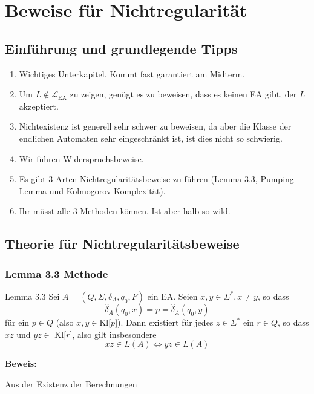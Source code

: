 \section{Beweise für Nichtregularität}


    \subsection{Einführung und grundlegende Tipps}
    \begin{enumerate}[label= \roman*.]
        \item Wichtiges Unterkapitel. Kommt fast garantiert am Midterm.
        \item Um $L \notin \mathcal{L}_{\text{EA}}$ zu zeigen, genügt es zu beweisen, dass es keinen EA gibt, der $L$ akzeptiert.
        \item Nichtexistenz ist generell sehr schwer zu beweisen, da aber die Klasse der endlichen Automaten sehr eingeschränkt ist, ist dies nicht so schwierig.
        \item Wir führen Widerspruchsbeweise.
        \item Es gibt 3 Arten Nichtregularitätsbeweise zu führen (Lemma 3.3, Pumping-Lemma und Kolmogorov-Komplexität).
        \item Ihr müsst alle 3 Methoden können. Ist aber halb so wild.
     \end{enumerate}

\subsection{Theorie für Nichtregularitätsbeweise}

\subsubsection{Lemma 3.3 Methode}
    \begin{mainbox}{Lemma 3.3}
        Sei $A = (Q, \Sigma, \delta_A, q_0, F)$ ein EA. Seien $x, y \in \Sigma^*, x \neq y$, so dass 
    $$\hat{\delta}_A(q_0, x) = p = \hat{\delta}_A(q_0, y)$$
    für ein $p \in Q$ (also $x,y \in \text{Kl[$p$]}$). Dann existiert für jedes $z \in \Sigma^*$ ein $r \in Q$, so dass $xz$ und $yz \in$ Kl[$r$], also gilt insbesondere 
    $$xz \in L(A) \iff yz \in L(A)$$
    \end{mainbox}

    \textbf{Beweis: }
    
    Aus der Existenz der Berechnungen 


